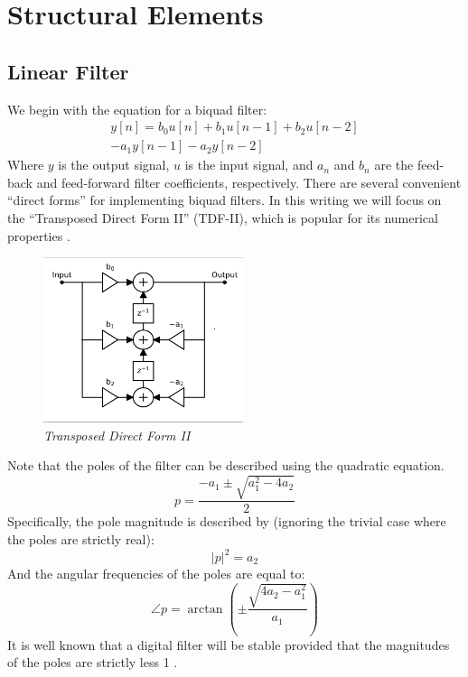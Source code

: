 \documentclass{IEEEtran}
\begin{document}
\section{Structural Elements}
\subsection{Linear Filter}
%
We begin with the equation for a biquad filter:
%
\begin{equation}
\begin{split}
    y[n] = b_0 u[n] + b_1 u[n-1] + b_2 u[n-2] \\ - a_1 y[n-1] - a_2 y[n-2]
\end{split}
    \label{eq:bq}
\end{equation}
%
Where $y$ is the output signal, $u$ is the input signal, and $a_n$ and $b_n$
are the feed-back and feed-forward filter coefficients, respectively.
There are several convenient ``direct forms'' for implementing biquad filters.
In this writing we will focus on the ``Transposed Direct Form II'' (TDF-II),
which is popular for its numerical properties \cite{JOSFilters}.
%
\begin{figure}[ht]
    \center
    \includegraphics[width=2.3in]{../Pics/TDF-II-White.png}
    \caption{\label{TDF-II}{\it Transposed Direct Form II}}
\end{figure}
%
Note that the poles of the filter can be described using the quadratic
equation.
\begin{equation}
    p = \frac{-a_1 \pm \sqrt{a_1^2- 4a_2}}{2}
    \label{eq:poles_lin}
\end{equation}
%
Specifically, the pole magnitude is described by (ignoring the
trivial case where the poles are strictly real):
\begin{equation}
    |p|^2 = a_2
    \label{eq:poles_lin_mag}
\end{equation}
%
And the angular frequencies of the poles are equal to:
\begin{equation}
    \angle p = \arctan \left( \pm \frac{\sqrt{4a_2 - a_1^2}}{a_1} \right)
    \label{eq:poles_lin_angle}
\end{equation}
%
It is well known that a digital filter will be stable provided that
the magnitudes of the poles are strictly less 1 \cite{JOSFilters}.
\newline
%
\end{document}
